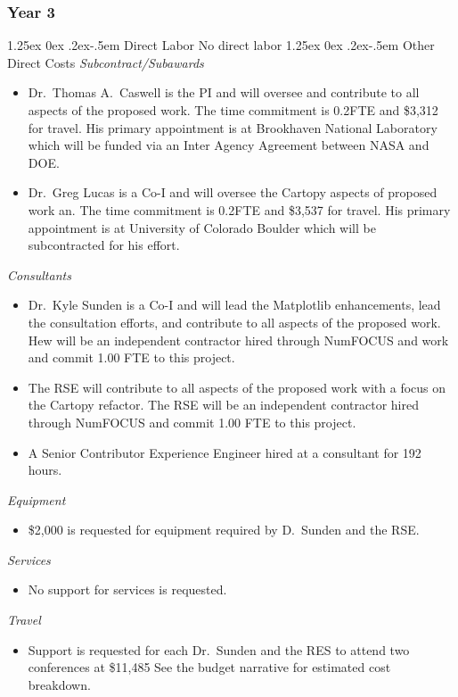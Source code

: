 \documentclass[12pt]{article}
\makeatletter
\numberwithin{page}{section}
\renewcommand{\paragraph}{%
  \@startsection{paragraph}{4}%
  {\z@}{1.25ex \@plus 0ex \@minus .2ex}{-.5em}%
  {\normalfont\normalsize\itshape\bfseries}%
}
\makeatother
\begin{document}
\subsubsection{Year 3}
\paragraph{Direct Labor}
No direct labor
\paragraph{Other Direct Costs}
\textit{Subcontract/Subawards}
\begin{itemize}
  \item Dr.\ Thomas A.\ Caswell is the PI and will oversee and contribute to
    all aspects of the proposed work.  The time commitment is 0.2FTE and \$3,312
    for travel.  His primary appointment is at Brookhaven National Laboratory
    which will be funded via an Inter Agency Agreement between NASA and DOE.
\item Dr.\ Greg Lucas is a Co-I and will oversee the Cartopy aspects of
  proposed work an.  The time commitment is 0.2FTE and \$3,537 for travel.  His
  primary appointment is at University of Colorado Boulder which will be
  subcontracted for his effort.
\end{itemize}
\textit{Consultants}
\begin{itemize}
  \item Dr.\ Kyle Sunden is a Co-I and will lead the Matplotlib enhancements,
    lead the consultation efforts, and contribute to all aspects of the
    proposed work.  Hew will be an independent contractor hired through NumFOCUS and work and commit
    1.00 FTE to this project.
  \item The RSE will contribute to all aspects of the proposed work with a
    focus on the Cartopy refactor.  The RSE will be an independent contractor hired
    through NumFOCUS and commit 1.00 FTE to this project.
  \item A Senior Contributor Experience Engineer hired at a consultant for 192 hours.

\end{itemize}
\textit{Equipment}
\begin{itemize}
\item \$2,000 is requested for equipment required by D.\ Sunden and the RSE.
\end{itemize}
\textit{Services}
\begin{itemize}
\item No support for services is requested.
\end{itemize}
\textit{Travel}
\begin{itemize}
\item Support is requested for each Dr.\ Sunden and the RES to attend two conferences at
  \$11,485  See the budget narrative for estimated cost  breakdown.
\end{itemize}
\end{document}
